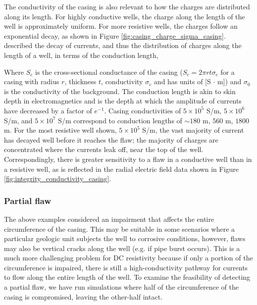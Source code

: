 \documentclass[extra,mreferee]{gji}
\begin{document}
The conductivity of the casing is also relevant to how the charges are distributed along its length. For highly conductive wells, the charge along the length of the well is approximately uniform. For more resistive wells, the charges follow an exponential decay, as shown in Figure \ref{fig:casing_charge_sigma_casing}. \cite{Schenkel1991} described the decay of currents, and thus the distribution of charges along the length of a well, in terms of the conduction length,

Where $S_c$ is the cross-sectional conductance of the casing ($S_c = 2\pi r t \sigma_c$ for a casing with radius $r$, thickness $t$, conductivity $\sigma_c$ and has units of [S $\cdot$ m]) and $\sigma_0$ is the conductivity of the background. The conduction length is akin to skin depth in electromagnetics and is the depth at which  the amplitude of currents have decreased by a factor of $e^{-1}$. Casing conductivities of $5 \times 10^5$ S/m, $5 \times 10^6$ S/m, and $5 \times 10^7$ S/m correspond to conduction lengths of $\sim 180$ m, $560$ m, $1800$ m. For the most resistive well shown, $5 \times 10^{5}$ S/m, the vast majority of current has decayed well before it reaches the flaw; the majority of charges are concentrated where the currents leak off, near the top of the well. Correspondingly, there is greater sensitivity to a flaw in a conductive well than in a resistive well, as is reflected in the radial electric field data shown in Figure \ref{fig:integrity_conductivity_casing}.










\subsubsection{Partial flaw}
The above examples considered an impairment that affects the entire circumference of the casing. This may be suitable in some scenarios where a particular geologic unit subjects the well to corrosive conditions, however, flaws may also be vertical cracks along the well (e.g. if pipe burst occurs). This is a much more challenging problem for DC resistivity because if only a portion of the circumference is impaired, there is still a high-conductivity pathway for currents to flow along the entire length of the well. To examine the feasibility of detecting a partial flaw, we have run simulations where half of the circumference of the casing is compromised, leaving the other-half intact.
\end{document}
